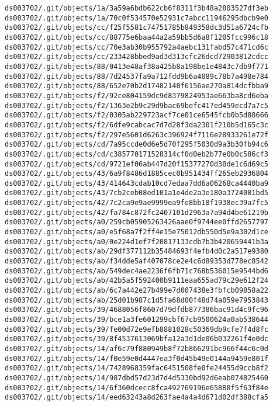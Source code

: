 \documentclass[11pt]{article}
\begin{document}
\begin{Verbatim}[commandchars=\\\{\}]
ds003702/.git/objects/1a/3a59a6bdb622cb6f8311f3b48a2803527df3eb
ds003702/.git/objects/1a/70c0f534570e52931c7abcc11946295dbcb9e0
ds003702/.git/objects/cc/f25f5581c74751785b849358dc3d51a6724cfb
ds003702/.git/objects/cc/88775e6baa44a2a59bb5d6a8f1205fcc996c18
ds003702/.git/objects/cc/70e3ab30b955792a4aebc131fabd57c471cd6c
ds003702/.git/objects/cc/233428bbed9ad3d313cfc26dcd72903812cdcc
ds003702/.git/objects/88/0413e48af38a425b8a198be1e4843c7db9f771
ds003702/.git/objects/88/7d24537fa9a712fdd9b6a4089c78b7a498e784
ds003702/.git/objects/88/652e70b2d17482140f6156ae270a814dcfbba9
ds003702/.git/objects/f2/92ce804159dc9d8379824953ae663ba8cd6eba
ds003702/.git/objects/f2/1363e2b9c29d9bac69befc417ed459ecd7a7c5
ds003702/.git/objects/f2/0305ab229723acf7ce01ce6545fcb0b5d88666
ds003702/.git/objects/f2/6dfe9cabcac7d7d28f3da2301f210b5d165c3c
ds003702/.git/objects/f2/297e5601d6263c396924f7116e28933261e72f
ds003702/.git/objects/cd/7a95ccde0d6e5d70f295f5030d9a3b30fb94c6
ds003702/.git/objects/cd/c385770171528314cf0d0eb2b77e0b0c586cf3
ds003702/.git/objects/cd/9721ef06ab447d20f15377270d30de1c6d69c5
ds003702/.git/objects/43/6a9f8486d1885cec0b951434ff265eb2936804
ds003702/.git/objects/43/414643cdab10cd7edaa7dd6a06268ca4440ba9
ds003702/.git/objects/43/7cb2ceb08ed101a1e4de2a3e180a3724081bd5
ds003702/.git/objects/42/7c2ca9e9ae9999ea9fe8bb18f1938ec39a7fc5
ds003702/.git/objects/42/fa784c872fc2407101d2963a7a94d4be61219b
ds003702/.git/objects/a0/259cb05905263426aae0f9744ee0ffd2657797
ds003702/.git/objects/a0/e5f68a7f2ff4e15e75012db550d5e9a302d1ce
ds003702/.git/objects/a0/0e224d1ef7f20817133cdb7b3b420659441b3a
ds003702/.git/objects/ab/29df377112b35484693f4efb4d0c2a517e9380
ds003702/.git/objects/ab/f34dde5af407078ce2e4c6d89353d778ec8542
ds003702/.git/objects/ab/549dec4ae2236f6fb71c768b536015e9544bd6
ds003702/.git/objects/ab/42b5a5f592400b9111eaa655ad79c29e612f24
ds003702/.git/objects/ab/6c7a442e27b499e7d007438e3fbfcb09858a22
ds003702/.git/objects/ab/25d01b987c1d5fa68d00f48d74a059e7953843
ds003702/.git/objects/39/4688056f8607d79dfdb877386bac91d4c9fc96
ds003702/.git/objects/39/bce1a3fe601299cbf67cb9500624a0ab538644
ds003702/.git/objects/39/fe00d72e9efb8881028c50369db9cfe7f4d8fc
ds003702/.git/objects/39/8f4537613069bfa12a3d1de06b032261f4e0dc
ds003702/.git/objects/14/af6c79f880949b8f72b866291bc966f44c6c0d
ds003702/.git/objects/14/f0e59e0d4447ea3f0d45b49e0144a9459e801f
ds003702/.git/objects/14/7428968359fac6451508fe0fe24455d9ccb8f2
ds003702/.git/objects/14/987dbd57d23d7d4d5330bd92d6eab074825460
ds003702/.git/objects/14/6f360dcecc8fca492769196e65888f5f63f84e
ds003702/.git/objects/14/eed63243a8d263fae4a4a4d671d02df388cfa5

\end{Verbatim}
\end{document}

